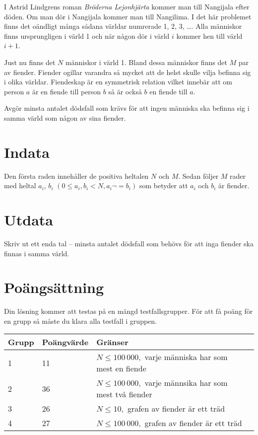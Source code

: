 \def\version{1}
I Astrid Lindgrens roman \emph{Bröderna Lejonhjärta} kommer man till Nangijala efter döden. Om man dör i Nangijala kommer man till Nangilima.
I det här problemet finns det oändligt många sådana världar numrerade 1, 2, 3, \dots. Alla människor finns ursprungligen i värld 1 och när någon dör i värld $i$ kommer hen till värld $i+1$.

Just nu finns det $N$ människor i värld 1. Bland dessa människor finns det $M$ par av fiender. Fiender ogillar varandra så mycket att de helst skulle vilja befinna sig i olika världar. Fiendeskap är en symmetrisk relation vilket innebär att om person $a$ är en fiende till person $b$ så är också $b$ en fiende till $a$.

Avgör minsta antalet dödsfall som krävs för att ingen människa ska befinna sig i samma värld som någon av sina fiender.

\section*{Indata}
Den första raden innehåller de positiva heltalen $N$ och $M$.
Sedan följer $M$ rader med heltal $a_i$, $b_i$ $(0 \le a_i, b_i < N, a_i \neg = b_i)$ som betyder att $a_i$ och $b_i$ är fiender.

\section*{Utdata}
Skriv ut ett enda tal -- minsta antalet dödsfall som behövs för att inga fiender ska finnas i samma värld.

\section*{Poängsättning}
Din lösning kommer att testas på en mängd testfallsgrupper. För att få poäng för en grupp
så måste du klara alla testfall i gruppen.

\noindent
\begin{tabular}{| l | l | l | l |}
\hline
Grupp & Poängvärde & Gränser \\ \hline
	1     & 11 & $N \le 100\,000,$ varje människa har som mest en fiende \\ \hline
	2     & 36 & $N \le 100\,000,$ varje männsika har som mest två fiender  \\ \hline
	3     & 26 & $N \le 10,$ grafen av fiender är ett träd \\ \hline
	4     & 27 & $N \le 100\,000,$ grafen av fiender är ett träd \\ \hline
\end{tabular}
